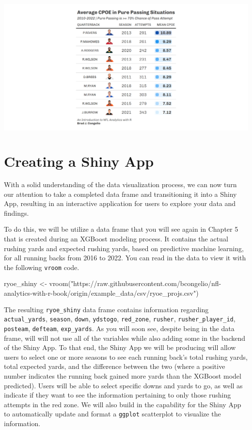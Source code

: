 \documentclass[
  letterpaper,
]{krantz}
\newenvironment{Shaded}{\begin{snugshade}}{\end{snugshade}}
\newcommand{\FunctionTok}[1]{\textcolor[rgb]{0.28,0.35,0.67}{#1}}
\newcommand{\NormalTok}[1]{\textcolor[rgb]{0.00,0.23,0.31}{#1}}
\newcommand{\OtherTok}[1]{\textcolor[rgb]{0.00,0.23,0.31}{#1}}
\newcommand{\StringTok}[1]{\textcolor[rgb]{0.13,0.47,0.30}{#1}}
\begin{document}
\includegraphics[width=6.61in,height=\textheight]{images/gt_table_5.png}

\hypertarget{creating-a-shiny-app}{%
\section{Creating a Shiny App}\label{creating-a-shiny-app}}

With a solid understanding of the data visualization process, we can now
turn our attention to take a completed data frame and transitioning it
into a Shiny App, resulting in an interactive application for users to
explore your data and findings.

To do this, we will be utilize a data frame that you will see again in
Chapter 5 that is created during an XGBoost modeling process. It
contains the actual rushing yards and expected rushing yards, based on
predictive machine learning, for all running backs from 2016 to 2022.
You can read in the data to view it with the following \texttt{vroom}
code.

\begin{Shaded}
\begin{Highlighting}[]
\NormalTok{ryoe\_shiny }\OtherTok{\textless{}{-}}
  \FunctionTok{vroom}\NormalTok{(}\StringTok{"https://raw.githubusercontent.com/bcongelio/nfl{-}analytics{-}with{-}r{-}book/origin/example\_data/csv/ryoe\_projs.csv"}\NormalTok{)}
\end{Highlighting}
\end{Shaded}

The resulting \texttt{ryoe\_shiny} data frame contains information
regarding \texttt{actual\_yards}, \texttt{season}, \texttt{down},
\texttt{ydstogo}, \texttt{red\_zone}, \texttt{rusher},
\texttt{rusher\_player\_id}, \texttt{posteam}, \texttt{defteam},
\texttt{exp\_yards}. As you will soon see, despite being in the data
frame, will will not use all of the variables while also adding some in
the backend of the Shiny App. To that end, the Shiny App we will be
producing will allow users to select one or more seasons to see each
running back's total rushing yards, total expected yards, and the
difference between the two (where a positive number indicates the
running back gained more yards than the XGBoost model predicted). Users
will be able to select specific downs and yards to go, as well as
indicate if they want to see the information pertaining to only those
rushing attempts in the red zone. We will also build in the capability
for the Shiny App to automatically update and format a \texttt{ggplot}
scatterplot to visualize the information.
\end{document}
